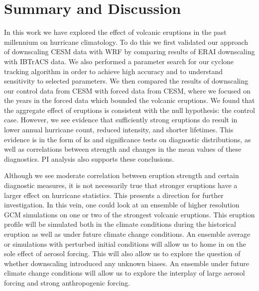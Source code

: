 \section{Summary and Discussion}
\label{discuss}
In this work we have explored the effect of volcanic eruptions in the past millennium on hurricane climatology. To do this we first validated our approach of downscaling CESM data with WRF by comparing results of ERAI downscaling with IBTrACS data. We also performed a parameter search for our cyclone tracking algorithm in order to achieve high accuracy and to understand sensitivity to selected parameters. We then compared the results of downscaling our control data from CESM with forced data from CESM, where we focused on the years in the forced data which bounded the volcanic eruptions. We found that the aggregate effect of eruptions is consistent with the null hypothesis: the control case. However, we see evidence that sufficiently strong eruptions do result in lower annual hurricane count, reduced intensity, and shorter lifetimes. This evidence is in the form of ks and significance tests on diagnostic distributions, as well as correlations between strength and changes in the mean values of these diagnostics. PI analysis also supports these conclusions. 
\par
Although we see moderate correlation between eruption strength and certain diagnostic measures, it is not necessarily true that stronger eruptions have a larger effect on hurricane statistics. This presents a direction for further investigation. In this vein, one could look at an ensemble of higher resolution GCM simulations on one or two of the strongest volcanic eruptions. This eruption profile will be simulated both in the climate conditions during the historical eruption as well as under future climate change conditions. An ensemble average or simulations with perturbed initial conditions will allow us to home in on the sole effect of aerosol forcing. This will also allow us to explore the question of whether downscaling introduced any unknown biases. An ensemble under future climate change conditions will allow us to explore the interplay of large aerosol forcing and strong anthropogenic forcing.    





